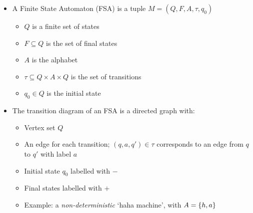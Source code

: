 \begin{itemize}
	
	\item A Finite State Automaton (FSA) is a tuple $ M = (Q, F, A, \tau, q_0) $
	
	\begin{itemize}
		
		\item $ Q $ is a finite set of states
		
		\item $ F \subseteq Q $ is the set of final states
		
		\item $ A $ is the alphabet
		
		\item $ \tau \subseteq Q \times A \times Q $ is the set of transitions
		
		\item $ q_0 \in Q $ is the initial state
		
	\end{itemize}

	\item The transition diagram of an FSA is a directed graph with:
	
	\begin{itemize}
		
		\item Vertex set $ Q $
		
		\item An edge for each transition; $ (q, a, q') \in \tau $ corresponds to an edge from $ q $ to $ q' $ with label $ a $
		
		\item Initial state $ q_0 $ labelled with $ - $
		
		\item Final states labelled with $ + $
		
		\item Example: a \textit{non-deterministic} `haha machine', with $ A = \left\lbrace h, a \right\rbrace $
		
		

\end{itemize}
\end{itemize}

